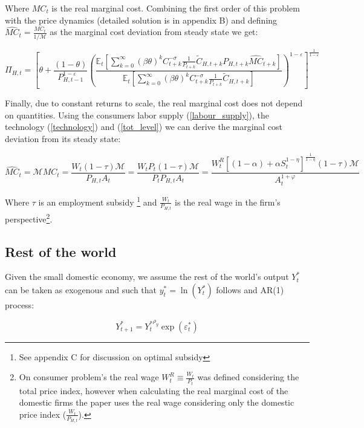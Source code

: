 \documentclass{article}
\newcommand{\Et}{\mathbb{E}_t}
\begin{document}
Where $MC_t$ is the real marginal cost. Combining the first order of this problem with the price dynamics (detailed solution is in appendix B) and defining $\widehat{MC}_t = \frac{MC_t}{1/ \mathcal M}$ as the marginal cost deviation from steady state we get:

\begin{equation}
    \label{nkpc}
    \Pi_{H,t} = \left[ \theta + \frac{(1-\theta)}{P_{H,t-1}^{1-\varepsilon}} \left(\frac{\Et\left[ \sum^\infty_{k=0} (\beta\theta)^k C_{t+k}^{-\sigma} \frac{1}{P_{t+k}}\tilde C_{H,t+k} P_{H,t+k} \widehat{MC}_{t+k}\right] }{\Et\left[ \sum^\infty_{k=0} (\beta\theta)^k C_{t+k}^{-\sigma} \frac{1}{P_{t+k}} \tilde C_{H,t+k}  \right]} \right)^{1-\varepsilon}\right]^\frac{1}{1-\varepsilon}
\end{equation}

Finally, due to constant returns to scale, the real marginal cost does not depend on quantities. Using the consumers labor supply (\ref{labour_supply}), the technology (\ref{technology}) and (\ref{tot_level}) we can derive the marginal cost deviation from its steady state:

\begin{equation}
    \label{marginal_cost}
    \widehat{MC}_t = \mathcal M MC_t = \frac{W_t (1 - \tau) \mathcal M}{P_{H,t}A_t} = \frac{W_t P_t (1 - \tau)\mathcal M}{P_t P_{H,t}A_t}
    = \frac{W_t^R \left[(1-\alpha) + \alpha S_t^{1-\eta} \right]^{\frac{1}{1-\eta}} (1 - \tau) \mathcal M}{A_t^{1+\varphi}}
\end{equation}

Where $\tau$ is an employment subsidy \footnote{See appendix C for discussion on optimal subsidy} and $\frac{W_t}{P_{H,t}}$ is the real wage in the firm's perspective\footnote{On consumer problem's the real wage $W_t^R \equiv \frac{W_t}{P_t}$ was defined considering the total price index, however when calculating the real marginal cost of the domestic firms the paper uses the real wage considering only the domestic price index ($\frac{W_t}{P_{H,t}}$).}.\\

\subsection{Rest of the world}
Given the small domestic economy, we assume the rest of the world's output $Y_t^*$ can be taken as exogenous and such that $y_t^* = \ln(Y^*_t)$ follows and AR(1) process:

\begin{equation}
    \label{y_row}
    Y^*_{t+1} = {Y^*_t}^{\rho_y}\exp( \varepsilon^*_t)
\end{equation}
\end{document}
